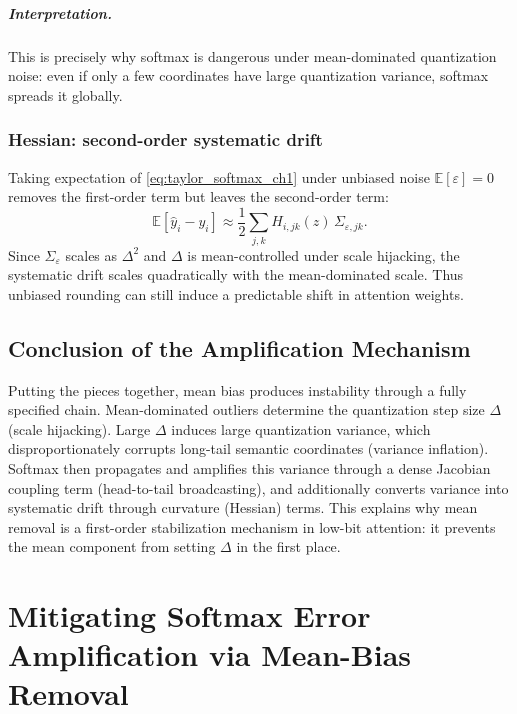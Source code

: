 \paragraph{Interpretation.}
This is precisely why softmax is dangerous under mean-dominated quantization noise:
even if only a few coordinates have large quantization variance, softmax spreads it globally.

\subsection{Hessian: second-order systematic drift}

Taking expectation of \eqref{eq:taylor_softmax_ch1} under unbiased noise
$\mathbb{E}[\varepsilon]=0$ removes the first-order term but leaves the second-order term:
\begin{equation}
\mathbb{E}[\hat y_i-y_i]
\approx
\frac12 \sum_{j,k} H_{i,jk}(z)\,\Sigma_{\varepsilon,jk}.
\label{eq:hessian_drift_ch1}
\end{equation}
Since $\Sigma_\varepsilon$ scales as $\Delta^2$ and $\Delta$ is mean-controlled under scale hijacking,
the systematic drift scales quadratically with the mean-dominated scale.
Thus unbiased rounding can still induce a predictable shift in attention weights.

\section{Conclusion of the Amplification Mechanism}

Putting the pieces together, mean bias produces instability through a fully specified chain.
Mean-dominated outliers determine the quantization step size $\Delta$ (scale hijacking).
Large $\Delta$ induces large quantization variance, which disproportionately corrupts long-tail semantic coordinates (variance inflation).
Softmax then propagates and amplifies this variance through a dense Jacobian coupling term (head-to-tail broadcasting), and additionally converts variance into systematic drift through curvature (Hessian) terms.
This explains why mean removal is a first-order stabilization mechanism in low-bit attention: it prevents the mean component from setting $\Delta$ in the first place.


\chapter{Mitigating Softmax Error Amplification via Mean-Bias Removal}
\label{ch:softmax_mitigate_mean}

